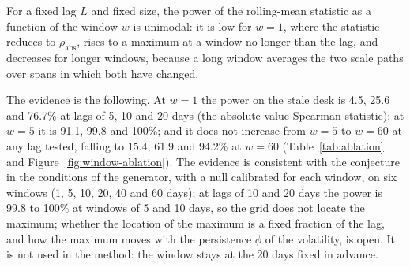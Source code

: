 \begin{remark}[Conjecture]
\label{rem:conjecture}
For a fixed lag $L$ and fixed size, the power of the rolling-mean statistic as a function of the window $w$ is unimodal: it is low for $w=1$, where the statistic reduces to $\rho_{\mathrm{abs}}$, rises to a maximum at a window no longer than the lag, and decreases for longer windows, because a long window averages the two scale paths over spans in which both have changed.
\end{remark}

The evidence is the following.
At $w=1$ the power on the stale desk is 4.5, 25.6 and 76.7\% at lags of 5, 10 and 20 days (the absolute-value Spearman statistic); at $w=5$ it is 91.1, 99.8 and 100\%; and it does not increase from $w=5$ to $w=60$ at any lag tested, falling to 15.4, 61.9 and 94.2\% at $w=60$ (Table~\ref{tab:ablation} and Figure~\ref{fig:window-ablation}).
The evidence is consistent with the conjecture in the conditions of the generator, with a null calibrated for each window, on six windows (1, 5, 10, 20, 40 and 60 days); at lags of 10 and 20 days the power is 99.8 to 100\% at windows of 5 and 10 days, so the grid does not locate the maximum; whether the location of the maximum is a fixed fraction of the lag, and how the maximum moves with the persistence $\phi$ of the volatility, is open.
It is not used in the method: the window stays at the 20 days fixed in advance.
